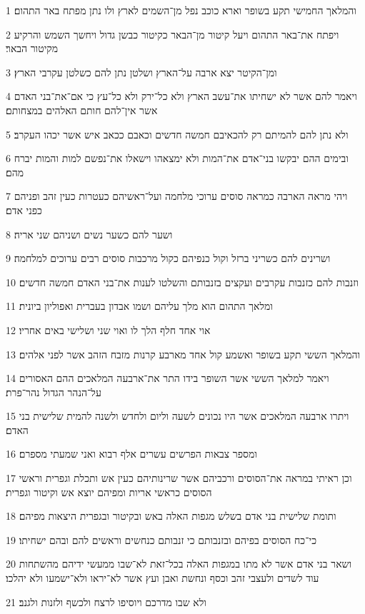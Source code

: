 \par 1 והמלאך החמישי תקע בשופר וארא כוכב נפל מן־השמים לארץ ולו נתן מפתח באר התהום׃
\par 2 ויפתח את־באר התהום ויעל קיטור מן־הבאר כקיטור כבשן גדול ויחשך השמש והרקיע מקיטור הבאר׃
\par 3 ומן־הקיטר יצא ארבה על־הארץ ושלטן נתן להם כשלטן עקרבי הארץ׃
\par 4 ויאמר להם אשר לא ישחיתו את־עשב הארץ ולא כל־ירק ולא כל־עץ כי אם־את־בני האדם אשר אין־להם חותם האלהים במצחותם׃
\par 5 ולא נתן להם להמיתם רק להכאיבם חמשה חדשים וכאבם ככאב איש אשר יכהו העקרב׃
\par 6 ובימים ההם יבקשו בני־אדם את־המות ולא ימצאהו וישאלו את־נפשם למות והמות יברח מהם׃
\par 7 ויהי מראה הארבה כמראה סוסים ערוכי מלחמה ועל־ראשיהם כעטרות כעין זהב ופניהם כפני אדם׃
\par 8 ושער להם כשער נשים ושניהם שני אריה׃
\par 9 ושרינים להם כשריני ברזל וקול כנפיהם כקול מרכבות סוסים רבים ערוכים למלחמה׃
\par 10 וזנבות להם כזנבות עקרבים ועקצים בזנבותם והשלטו לענות את־בני האדם חמשה חדשים׃
\par 11 ומלאך התהום הוא מלך עליהם ושמו אבדון בעברית ואפוליון ביונית׃
\par 12 אוי אחד חלף הלך לו ואוי שני ושלישי באים אחריו׃
\par 13 והמלאך הששי תקע בשופר ואשמע קול אחד מארבע קרנות מזבח הזהב אשר לפני אלהים׃
\par 14 ויאמר למלאך הששי אשר השופר בידו התר את־ארבעה המלאכים ההם האסורים על־הנהר הגדול נהר־פרת׃
\par 15 ויתרו ארבעה המלאכים אשר היו נכונים לשעה וליום ולחדש ולשנה להמית שלישית בני האדם׃
\par 16 ומספר צבאות הפרשים עשרים אלף רבוא ואני שמעתי מספרם׃
\par 17 וכן ראיתי במראה את־הסוסים ורכביהם אשר שרינותיהם כעין אש ותכלת וגפרית וראשי הסוסים כראשי אריות ומפיהם יוצא אש וקיטור וגפרית׃
\par 18 ותומת שלישית בני אדם בשלש מגפות האלה באש ובקיטור ובגפרית היצאות מפיהם׃
\par 19 כי־כח הסוסים בפיהם ובזנבותם כי זנבותם כנחשים וראשים להם ובהם ישחיתו׃
\par 20 ושאר בני אדם אשר לא מתו במגפות האלה בכל־זאת לא־שבו ממעשי ידיהם מהשתחות עוד לשדים ולעצבי זהב וכסף ונחשת ואבן ועץ אשר לא־יראו ולא־ישמעו ולא יהלכו׃
\par 21 ולא שבו מדרכם ויוסיפו לרצח ולכשף ולזנות ולגנב׃

